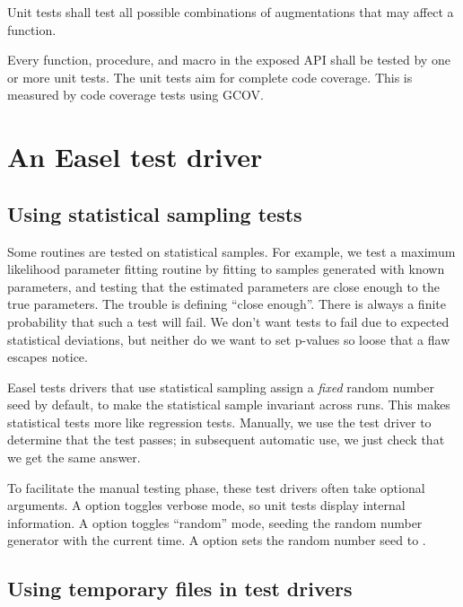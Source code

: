 Unit tests shall test all possible combinations of augmentations that
may affect a function.

Every function, procedure, and macro in the exposed API shall be
tested by one or more unit tests. The unit tests aim for complete code
coverage. This is measured by code coverage tests using GCOV.


\section{An Easel test driver}


\subsection{Using statistical sampling tests}

Some routines are tested on statistical samples. For example, we test
a maximum likelihood parameter fitting routine by fitting to samples
generated with known parameters, and testing that the estimated
parameters are close enough to the true parameters.  The trouble is
defining ``close enough''. There is always a finite probability that
such a test will fail. We don't want tests to fail due to expected
statistical deviations, but neither do we want to set p-values so
loose that a flaw escapes notice.

Easel tests drivers that use statistical sampling assign a
\emph{fixed} random number seed by default, to make the statistical
sample invariant across runs. This makes statistical tests more like
regression tests. Manually, we use the test driver to determine that
the test passes; in subsequent automatic use, we just check that we
get the same answer.

To facilitate the manual testing phase, these test drivers often take
optional arguments. A  option toggles verbose mode, so unit
tests display internal information. A  option toggles
``random'' mode, seeding the random number generator with the current
time. A  option sets the random number seed to
.


\subsection{Using temporary files in test drivers}

